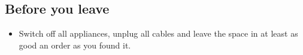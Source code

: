 \documentclass[../Elmag-labhefte-2020.tex]{subfiles}
\begin{document}
\subsection{Before you leave}

\begin{itemize}
    \item Switch off all appliances, unplug all cables and leave the space in at least as good an order as you found it.
\end{itemize}

\end{document}
